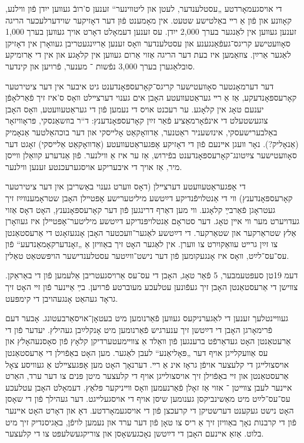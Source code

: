 \documentclass{article}
\begin{document}
\begin{pairs}
\begin{Rightside}
\begin{RTL}
\begin{hebrew}
די אויסגעמאָרדטע „עסטלענדער, לעטן און ליטװינער“ זענען ס'רובֿ געװען
ייִדן פֿון װילנע, קאָװנע און פֿון אַ רײ באַלטישע שטעט. אין מאָמענט פֿוּן דער
דאָזיקער שוידערלעכער הריגה זענען געװען אין לאַנגער בערך 2,000 ייִדן. עס
זענען דעמאָלט דאָרט אויך געװען בערך 1,000 סאָװעטישע קריגס־געפֿאַנגענע און
עסטלענדער װאָס זענען אַרײַנגעטריבן געװאָרן אין דאָזיקן לאַגער אַרײַן.
צוזאַמען איז בעת דער הריגה אַזוי אַרום געװען אין קלאָגע און אין די אַרומיקע
סובלאַגערן בערך 3,000 נפֿשות ־ מענער, פֿרויען און קינדער.

דער דערמאָנטער סאָװעטישער קריגס־קאָרעספּאָנדענט גיט איבער אין
דער ציטירטער קאָרעספּאָנדעקע, אַז אַ רײ געראַטעװעטע האָבן אים גענוי דערצײלט
װאָס ס'איז זיך פֿאַרלאָפֿן יענעם טאָג אין קלאָגע. ער רעכנט אויס די נעמען
פֿון די געראַטעװעטע, װאָס האָבן צוגעשטעלט די אינפֿאָרמאַציע פֿאַר זײַן קאָרעספּאָנדענץ:
 ד“ר בוזשאַנסקי, פּראָװיזאָר באַלבערישעסקי, אינזשעניר ראַטנער,
 אַדװאָקאַט אָלײסקי און דער בוכהאַלטער אַנאָמיק (אַנאָליק?). 
נאָר װעגן אײנעם פֿוּן די דאָזיקע אָפּגעראַטעװעטע (אַדװאָקאַט אַלײסקי) זאָגט דער סאָװעטישער
צײַטונג־קאָרעספּאָנדענט בפֿירוש, אַז ער איז אַ װילנער. פֿוּן אַנדערע קװאַלן
װײסן מיר, אַז אויך די איבעריקע אויסגערעכנטע זענען װילנער.

די אָפּגעראַטעװעטע דערצײלן (דאָס װערט גענוי באַשריבן איִן דער ציטירטער
 קאָרעספּאָנדענץ) װי די אַנטלויפֿנדיקע דײַטשע מיליטערישע אָפּטײלן
 האָבן שטראָמענװײַז זיך געטראָגן פֿאַרבײַ קלאָגע. װי מען דאַרף דרינגען פֿון
דער קאָרעספּאָנענץ, האָט דאָס אַזוי געדויערט מער װי אײן טאָג. דער סטראָם
אַנטלויפּנדיקע דײַטשע מיליטער־אָפּטײלן איז געװאָרן אַלץ שטראַרקער און שטאַרקער.
די דײַטשע לאַגער־װעכטער האָבן אָנגעזאָגט די אַרעסטאַנטן צו זײַן גרײט
עװאַקויִרט צו װערן. אין לאַגער האָט זיך באַװיזן אַ „זאָנדערקאָמאַנדעע“ פֿון
עס־עס־לײַט, װאָס איז אָנגעקומען פֿון דער נישט־װײַטער עסטלענדישער
הויפּשטאַט טאַלין.

דעמ 19טן סעפּטעמבער, 5 פֿאַר טאָג, האָבן די עס־עס אַרויסגעטריבן אַלעמען
פֿון די באַראַקן. צװישן די אַרעסטאַנטן האָבן זיך געפֿונען עטלעכע מעוברטע
פֿרויען. בײַ אַײנער פֿון זײ האָט זיך גראָד געהאַט אָנגעהויבן די קימפּעט.

געװײנטלעך זענען די לאַגערניקעס געװען פֿאַרנומען מיט בעטאָן־אויסאַרבעטונג.
אָבער דעם פֿרימאָרגן האָבן די דײַטשן זיך ענערגיש פֿאַרנומען מיט
אָנקלײַבן געהילץ. יעדער פֿון די אַרעטאַנטן האָט געדאַרפֿט ברענגען פֿון װאַלד
אַ צװײמעטערדיקן קלאָץ פֿון סאָסנעהאָלץ און עס אַװעקלײגן אויף דער „פּאָליאַנע“
לעבן לאַגער. מען האָט באַפֿוילן די אַרעסטאַנטן אויסצולײגן די  קלעצער אויפֿן
גראָז אינ אַ רײ. דערנאָך האָט מען אָפּגעצײלט אַ געװיסע צאָל אַרעסטאַנטן
און זײ באַפֿוילן זיך אויסצולײגן אויף די קלעצער מיטן פּנים צו דער ערד, האַרט 
אײנער לעבן  צװײטן ־ אזוי אַז זאָלן פֿאַרנעמען װאָס װײניקער פּלאַץ. דעמאָלט 
האָבן עטלעכע עס־עס־לײַט מיט מאַשינביקסן גענומען שיסן אויף די אויסגעלײגט.
דער געהילך פֿון די שאָסן האָט נישט געקענט דערשטיקן די קרעכצן
פֿון די אויסגעמאָרדטע. דאָ און דאָרט האָט אײנער פֿון די קרבנות נאָך באַװיזן זיך
אַ ריס צו טאָן פֿון דער ערד און נעמען לויפֿן, באַגיסנדיק זיך מיט בלוט. אַזאַ
אײנעם האָבן די דײַטשן נאָכגעשאָסן און צוריקגעשלעפּט צו די קלעצער.


\end{hebrew}
\end{RTL}
\end{Rightside}
\end{pairs}
\end{document}
